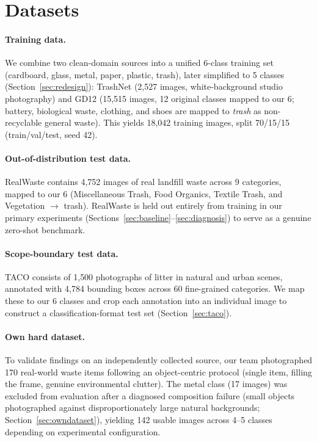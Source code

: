 \documentclass[a4paper]{article}
\begin{document}
\section{Datasets}
\label{sec:datasets}

\paragraph{Training data.} We combine two clean-domain sources into a unified 6-class training set (cardboard, glass, metal, paper, plastic, trash), later simplified to 5 classes (Section~\ref{sec:redesign}): TrashNet (2{,}527 images, white-background studio photography) and GD12 (15{,}515 images, 12 original classes mapped to our 6; battery, biological waste, clothing, and shoes are mapped to \emph{trash} as non-recyclable general waste). This yields 18{,}042 training images, split 70/15/15 (train/val/test, seed 42).

\paragraph{Out-of-distribution test data.} RealWaste \citep{realwaste} contains 4{,}752 images of real landfill waste across 9 categories, mapped to our 6 (Miscellaneous Trash, Food Organics, Textile Trash, and Vegetation $\to$ trash). RealWaste is held out entirely from training in our primary experiments (Sections~\ref{sec:baseline}--\ref{sec:diagnosis}) to serve as a genuine zero-shot benchmark.

\paragraph{Scope-boundary test data.} TACO \citep{taco2020} consists of 1{,}500 photographs of litter in natural and urban scenes, annotated with 4{,}784 bounding boxes across 60 fine-grained categories. We map these to our 6 classes and crop each annotation into an individual image to construct a classification-format test set (Section~\ref{sec:taco}).

\paragraph{Own hard dataset.} To validate findings on an independently collected source, our team photographed 170 real-world waste items following an object-centric protocol (single item, filling the frame, genuine environmental clutter). The metal class (17 images) was excluded from evaluation after a diagnosed composition failure (small objects photographed against disproportionately large natural backgrounds; Section~\ref{sec:owndataset}), yielding 142 usable images across 4--5 classes depending on experimental configuration.
\end{document}

